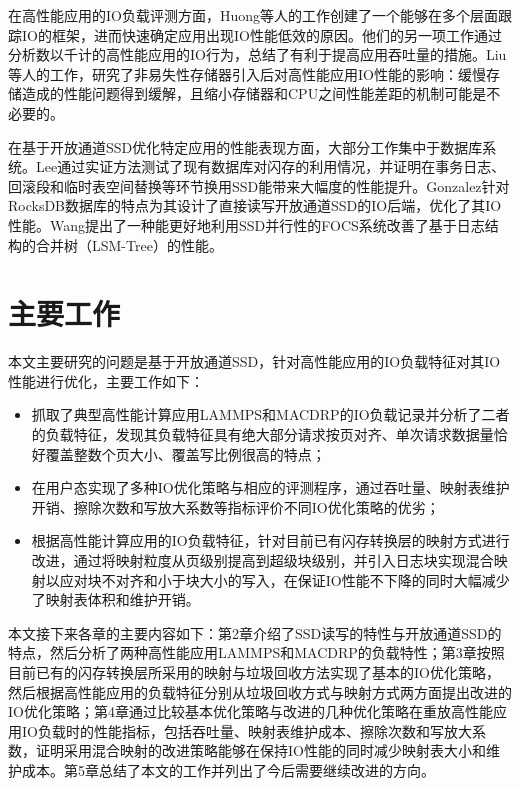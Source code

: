 在高性能应用的IO负载评测方面，Huong等人的工作\cite{luu_multi-level_nodate}创建了一个能够在多个层面跟踪IO的框架，进而快速确定应用出现IO性能低效的原因。他们的另一项工作\cite{luu_multiplatform_2015}通过分析数以千计的高性能应用的IO行为，总结了有利于提高应用吞吐量的措施。Liu等人的工作\cite{liu_performance_2017}，研究了非易失性存储器引入后对高性能应用IO性能的影响：缓慢存储造成的性能问题得到缓解，且缩小存储器和CPU之间性能差距的机制可能是不必要的。

在基于开放通道SSD优化特定应用的性能表现方面，大部分工作集中于数据库系统。Lee\cite{lee_case_2008}通过实证方法测试了现有数据库对闪存的利用情况，并证明在事务日志、回滚段和临时表空间替换等环节换用SSD能带来大幅度的性能提升。Gonzalez\cite{gonzalez_towards_nodate}针对RocksDB数据库的特点为其设计了直接读写开放通道SSD的IO后端，优化了其IO性能。Wang\cite{wang_efficient_2014}提出了一种能更好地利用SSD并行性的FOCS系统改善了基于日志结构的合并树（LSM-Tree）的性能。

\section{主要工作}
本文主要研究的问题是基于开放通道SSD，针对高性能应用的IO负载特征对其IO性能进行优化，主要工作如下：
\begin{itemize}
    \item 抓取了典型高性能计算应用LAMMPS和MACDRP的IO负载记录并分析了二者的负载特征，发现其负载特征具有绝大部分请求按页对齐、单次请求数据量恰好覆盖整数个页大小、覆盖写比例很高的特点；
    \item 在用户态实现了多种IO优化策略与相应的评测程序，通过吞吐量、映射表维护开销、擦除次数和写放大系数等指标评价不同IO优化策略的优劣；
    \item 根据高性能计算应用的IO负载特征，针对目前已有闪存转换层的映射方式进行改进，通过将映射粒度从页级别提高到超级块级别，并引入日志块实现混合映射以应对块不对齐和小于块大小的写入，在保证IO性能不下降的同时大幅减少了映射表体积和维护开销。
\end{itemize}

本文接下来各章的主要内容如下：第2章介绍了SSD读写的特性与开放通道SSD的特点，然后分析了两种高性能应用LAMMPS和MACDRP的负载特性；第3章按照目前已有的闪存转换层所采用的映射与垃圾回收方法实现了基本的IO优化策略，然后根据高性能应用的负载特征分别从垃圾回收方式与映射方式两方面提出改进的IO优化策略；第4章通过比较基本优化策略与改进的几种优化策略在重放高性能应用IO负载时的性能指标，包括吞吐量、映射表维护成本、擦除次数和写放大系数，证明采用混合映射的改进策略能够在保持IO性能的同时减少映射表大小和维护成本。第5章总结了本文的工作并列出了今后需要继续改进的方向。